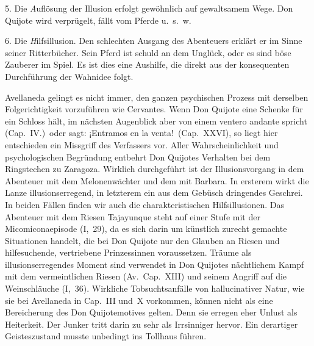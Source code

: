 5. Die {\emph Auflösung der Illusion} erfolgt gewöhnlich auf gewaltsamem
Wege. Don Quijote wird verprügelt, fällt vom Pferde u.~s.~w.

6. Die {\emph Hilfsillusion}. Den schlechten Ausgang des Abenteuers
erklärt er im Sinne seiner Ritterbücher. Sein Pferd ist schuld an dem
Unglück, oder es sind böse Zauberer im Spiel. Es ist dies eine
Aushilfe, die direkt aus der konsequenten Durchführung der Wahnidee folgt.

Avellaneda gelingt es nicht immer, den ganzen psychischen Prozess
mit derselben Folgerichtigkeit vorzuführen wie Cervantes. Wenn Don
Quijote eine Schenke für ein Schloss hält, im nächsten Augenblick aber
von einem {\itquoted\spanish ventero andante} spricht (Cap.~IV.)\ oder sagt:
{\itquoted\spanish ¡Entramos en la venta!}~(Cap.~XXVI),
so liegt hier entschieden ein Missgriff des
Verfassers vor. Aller Wahrscheinlichkeit und psychologischen Begründung
entbehrt Don Quijotes Verhalten bei dem Ringstechen zu Zaragoza.
Wirklich durchgeführt ist der Illusionsvorgang in dem Abenteuer mit
dem Melonenwächter und dem mit Barbara. In ersterem wirkt die
Lanze illusionserregend, in letzterem ein aus dem Gebüsch dringendes
Geschrei. In beiden Fällen finden wir auch die charakteristischen
Hilfsillusionen. Das Abenteuer mit dem Riesen Tajayunque steht auf
einer Stufe mit der Micomiconaepisode (I,~29), da es sich darin um
künstlich zurecht gemachte Situationen handelt, die bei Don Quijote
nur den Glauben an Riesen und hilfesuchende, vertriebene Prinzessinnen
voraussetzen. Träume als illusionserregendes Moment sind verwendet
in Don Quijotes nächtlichem Kampf mit dem vermeintlichen Riesen
(Av.\ Cap.~XIII) und seinem Angriff auf die Weinschläuche (I,~36).
Wirkliche Tobsuchtsanfälle von hallucinativer Natur, wie sie bei
Avellaneda in Cap.~III und~X vorkommen, können nicht als eine Bereicherung
des Don Quijotemotives gelten. Denn sie erregen eher
Unlust als Heiterkeit. Der Junker tritt darin zu sehr als Irrsinniger
hervor. Ein derartiger Geisteszustand musste unbedingt ins Tollhaus führen.

